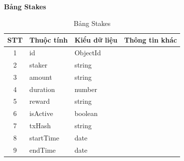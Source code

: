 \hspace{-1cm}\textbf{Bảng Stakes}
\begin{table}[H]
    \centering
    \begin{tabular}{|c|l|l|l|}
        \hline
        STT & Thuộc tính & Kiểu dữ liệu & Thông tin khác \\
        \hline
        1   & id         & ObjectId     &                \\
        \hline
        2   & staker     & string       &                \\
        \hline
        3   & amount     & string       &                \\
        \hline
        4   & duration   & number       &                \\
        \hline
        5   & reward     & string       &                \\
        \hline
        6   & isActive   & boolean      &                \\
        \hline
        7   & txHash     & string       &                \\
        \hline
        8   & startTime  & date         &                \\
        \hline
        9   & endTime    & date         &                \\
        \hline
    \end{tabular}
    \caption{Bảng Stakes}
    \label{tab:stakes}
\end{table}

